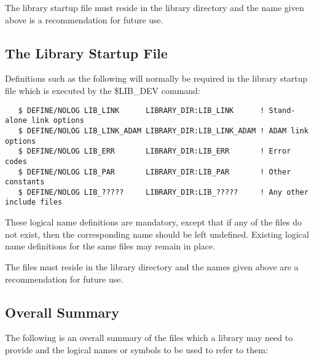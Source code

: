 The library startup file must reside in the library directory and the name
given above is a recommendation for future use. 

\subsection{The Library Startup File}

Definitions such as the following will normally be required in the library
startup file which is executed by the \$LIB\_DEV command:

\begin{verbatim}
   $ DEFINE/NOLOG LIB_LINK      LIBRARY_DIR:LIB_LINK      ! Stand-alone link options
   $ DEFINE/NOLOG LIB_LINK_ADAM LIBRARY_DIR:LIB_LINK_ADAM ! ADAM link options
   $ DEFINE/NOLOG LIB_ERR       LIBRARY_DIR:LIB_ERR       ! Error codes
   $ DEFINE/NOLOG LIB_PAR       LIBRARY_DIR:LIB_PAR       ! Other constants
   $ DEFINE/NOLOG LIB_?????     LIBRARY_DIR:LIB_?????     ! Any other include files
\end{verbatim}

These logical name definitions are mandatory, except that if any of the
files do not exist, then the corresponding name should be left undefined. 
Existing logical name definitions for the same files may remain in place.

The files must reside in the library directory and the names given above are
a recommendation for future use. 

\subsection{Overall Summary}

The following is an overall summary of the files which a library may need to
provide and the logical names or symbols to be used to refer to them: 

